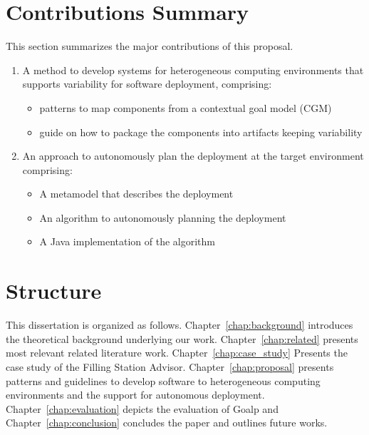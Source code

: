 
\section{Contributions Summary}

This section summarizes the major contributions of this proposal.

\begin{enumerate}

\item A method to develop systems for heterogeneous computing environments that supports variability for software deployment, comprising:
\begin{itemize}
  \item patterns to map components from a contextual goal model (CGM)
  \item guide on how to package the components into artifacts keeping variability
\end{itemize}

\item An approach to autonomously plan the deployment at the target environment comprising:
\begin{itemize}
  \item A metamodel that describes the deployment
  \item An algorithm to autonomously planning the deployment
  \item A Java implementation of the algorithm
\end{itemize}

\end{enumerate}

\section{Structure}

This dissertation is organized as follows. Chapter~\ref{chap:background} introduces the theoretical background underlying our work. Chapter~\ref{chap:related} presents most relevant related literature work. Chapter~\ref{chap:case_study} Presents the case study of the Filling Station Advisor. Chapter~\ref{chap:proposal} presents patterns and guidelines to develop software to heterogeneous computing environments and the support for autonomous deployment.
 Chapter~\ref{chap:evaluation} depicts the evaluation of Goalp and Chapter~\ref{chap:conclusion} concludes the paper and outlines future works.

